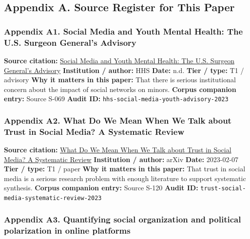 \documentclass[
  american,
  11pt,
  letterpaper,
]{article}
\begin{document}
\subsection{Appendix A. Source Register for This
Paper}\label{appendix-a.-source-register-for-this-paper-2}

\subsubsection{Appendix A1. Social Media and Youth Mental Health: The
U.S. Surgeon General's
Advisory}\label{ch-02-appendix-a1-social-media-and-youth-mental-health-the-u-s-surgeon-general-s-advisory}

\textbf{Source citation:}
\href{https://www.hhs.gov/surgeongeneral/priorities/youth-mental-health/social-media/index.html}{Social
Media and Youth Mental Health: The U.S. Surgeon General's Advisory}
\textbf{Institution / author:} HHS \textbf{Date:} n.d. \textbf{Tier /
type:} T1 / advisory \textbf{Why it matters in this paper:} That there
is serious institutional concern about the impact of social networks on
minors. \textbf{Corpus companion entry:} Source S-069 \textbf{Audit ID:}
\texttt{hhs-social-media-youth-advisory-2023}

\subsubsection{Appendix A2. What Do We Mean When We Talk about Trust in
Social Media? A Systematic
Review}\label{ch-02-appendix-a2-what-do-we-mean-when-we-talk-about-trust-in-social-media-a-systematic-review}

\textbf{Source citation:} \href{https://arxiv.org/abs/2302.03671}{What
Do We Mean When We Talk about Trust in Social Media? A Systematic
Review} \textbf{Institution / author:} arXiv \textbf{Date:} 2023-02-07
\textbf{Tier / type:} T1 / paper \textbf{Why it matters in this paper:}
That trust in social media is a serious research problem with enough
literature to support systematic synthesis. \textbf{Corpus companion
entry:} Source S-120 \textbf{Audit ID:}
\texttt{trust-social-media-systematic-review-2023}

\subsubsection{Appendix A3. Quantifying social organization and
political polarization in online
platforms}\label{ch-02-appendix-a3-quantifying-social-organization-and-political-polarization-in-online-platforms}
\end{document}
